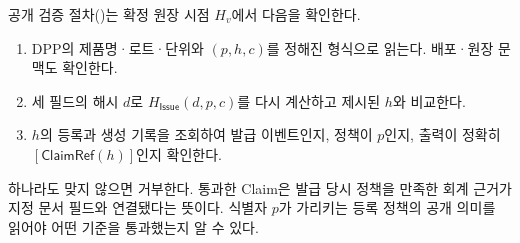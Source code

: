 공개 검증 절차()는 확정 원장 시점 $H_v$에서 다음을 확인한다.
\begin{enumerate}
\item DPP의 제품명·로트·단위와 $(p,h,c)$를 정해진 형식으로 읽는다.
배포·원장 문맥도 확인한다.
\item 세 필드의 해시 $d$로 $H_{\mathsf{Issue}}(d,p,c)$를 다시
계산하고 제시된 $h$와 비교한다.
\item $h$의 등록과 생성 기록을 조회하여 발급 이벤트인지,
정책이 $p$인지, 출력이 정확히 $[\mathsf{ClaimRef}(h)]$인지 확인한다.
\end{enumerate}
하나라도 맞지 않으면 거부한다. 통과한 Claim은 발급 당시 정책을
만족한 회계 근거가 지정 문서 필드와 연결됐다는 뜻이다.
식별자 $p$가 가리키는 등록 정책의 공개 의미를 읽어야 어떤 기준을
통과했는지 알 수 있다.
